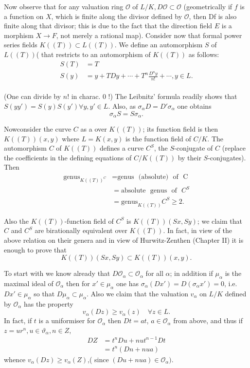 Now observe that for any valuation ring $\mathscr{O}$ of $L/K,
D\mathscr{O}\subset \mathscr{O}$ (geometrically if $f$ is a  function
on $X$, which is finite along the divisor defined by $\mathscr{O}$,
then Df is also finite along that divisor; this is due to the fact
that the direction field $E$ is a morphism $X\longrightarrow F$, not
merely a rational map). Consider now that formal power   series fields
$K((T))\subset L ((T))$. We define an automorphism $S$ of $L((T))$(
that restricts to an automorphism of $K((T))$ as follows: 
\begin{align*}
  S(T) & = T\\
  S(y) & = y + T Dy + \cdots +T^n\frac{D^n y}{n!}+\cdots, y \in L.\\
\end{align*}

(One can divide by $n!$  in charac. $0$ !) The Leibnitz' formula
readily shows that $S(yy')=S(y)S(y')\forall y,y'\in L$. Also, as
$\sigma_\alpha  D=D' \sigma_\alpha $ one obtains  
$$ 
\sigma_\alpha  S=S \sigma_\alpha.
$$

Now\pageoriginale consider the curve $C$ as a over $K((T))$; its function field is
then $K((T))(x,y)$ where $L=K (x,y)$ is the function field of
$C/K$. The automorphism $C$ of $K((T))$ defines a curve $C^S$, the
$S$-conjugate of $C$ (replace the coefficients in the defining
equations of $C/K((T))$ by their $S$-conjugates). Then  
\begin{align*}
  \text{genus}_{K((T))^C} & = \text{genus~ (absolute)~ of~ C}\\
  & = \text{absolute~ genus~ of~ }C^S\\
  & = \text{genus}_{K((T))} C^S\geq 2.
\end{align*}  

Also the $K((T))$-function field of $C^S$ is $K((T))(Sx,Sy)$; we
claim that $C$ and $C^S$ are birationally equivalent over $K((T))$. In
fact, in view of the above relation on their genera and in view of
Hurwitz-Zenthen (Chapter II) it is enough to prove that  
 $$ 
 K((T))(Sx,Sy)\subset K ((T))(x,y).
 $$  
 
 To start with we know already that  $D\mathscr{O}_\alpha  \subset
 \mathscr{O}_\alpha $ for all $\alpha$; in addition if $\mu_\alpha  $
 is the maximal ideal of $\mathscr{O}_\alpha  $ then
 for $x'\in \mu _\alpha$ one has $\sigma_\alpha  (Dx')=D(\sigma_\alpha
 x')=0$, i.e. $Dx'\in \mu _\alpha$ so that  $D\mu_\alpha \subset \mu
 _\alpha $. Also we claim that the valuation $v_\alpha  $ on $L/K$
 defined by $\mathscr{O}_\alpha $ has the property 
 $$
 v_\alpha (Dz)\geq v_\alpha (z) \quad \forall z\in L.
 $$  
In fact, if $t$ is a uniformiser for $\mathscr{O}_\alpha $ then
$Dt=at$, $a \in \mathscr{O}_\alpha $ from above, and thus if $z  =
ur^n, u\in \vartheta_\alpha , n\in {Z}$, 
\begin{align*}
  DZ & = t^n Du+nut^{n-1} Dt\\
  & =  t^n (Dn+nua)
\end{align*}
whence $v_\alpha  (Dz)\geq v_\alpha  (Z)$,( since $(Du+nua)\in
\mathscr{O}_\alpha )$. 

